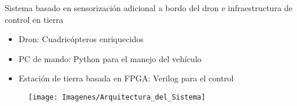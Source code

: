 \documentclass[a4,landscpae]{seminar}
\begin{document}
\begin{hslide}
Sistema basado en sensorizaci\'on adicional a bordo del dron e infraestructura de control en tierra\\

\begin{minipage}{4.5cm}
	\begin{itemize}
		\item Dron: Cuadric\'opteros enriquecidos
	\end{itemize}
	\begin{itemize}
		\item PC de mando: Python para el manejo del veh\'iculo
		\item Estaci\'on de tierra basada en FPGA: Verilog para el control
	\end{itemize}
\end{minipage} \hfill
\begin{minipage}{6cm}
	\begin{figure}
		\texttt{[image: Imagenes/Arquitectura\_del\_Sistema]}
	\end{figure}
\end{minipage} \hfill
\end{hslide}
\begin{hslide}

\end{hslide}
\begin{hslide}

\end{hslide}
\begin{hslide}

\end{hslide}



\begin{hslide}

\end{hslide}
\begin{hslide}

\end{hslide}
\end{document}
